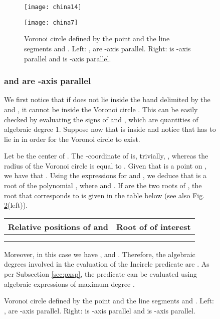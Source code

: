 \documentclass[letterpaper,11pt]{article}
\newcommand{\incircle}{\textsf{Incircle}\xspace}
\newcommand{\vor}{Voronoi\xspace}
\begin{document}
{\begin{figure}[!b]
\begin{figure}[t]
  \begin{center}
    \begin{minipage}{0.442\textwidth}
\hspace*{1mm}\texttt{[image: china14]}\vspace*{2mm}
    \end{minipage}\begin{minipage}{0.44\textwidth}
\hspace*{5mm}\texttt{[image: china7]}
    \end{minipage}
  \end{center}
  \caption{Voronoi circle defined by the point  and the line
    segments  and . Left: ,  are -axis
    parallel. Right:  is -axis parallel and  is -axis
    parallel.}
  \label{fig:pss}
\end{figure}  




\subsubsection{ and  are -axis parallel}\label{sec:pssp-parallel}

We first notice that if  does not lie inside the band 
delimited by the  and , it cannot be inside the
\vor circle . This can be easily checked by evaluating the
signs of  and , which are quantities of algebraic
degree 1. Suppose now that  is inside  and notice that  has
to lie in  in order for the \vor circle  to exist. 

Let  be the center of . The -coordinate of  is,
trivially, , whereas the radius  of
the \vor circle is equal to . Given that
 is a point on , we have that . Using
the expressions for  and , we deduce that  is a root
of the polynomial , where
 and .
If  are the two roots of , the root that
corresponds to  is given in the table below (see also
Fig. \ref{fig:pss}(left)).
\begin{center}
\begin{tabular}{|c|c|}
\hline
Relative positions of  and  & Root of  of interest\\
\hline \hline
&\\\hline
&\\\hline
\end{tabular}
\end{center}
Moreover, in this case we have ,
 and . Therefore, the algebraic degrees
involved in the evaluation of the \incircle predicate are
. As per Subsection \ref{sec:pxsp},
the  predicate can be evaluated using algebraic
expressions of maximum degree .


\end{figure}}
\end{document}
